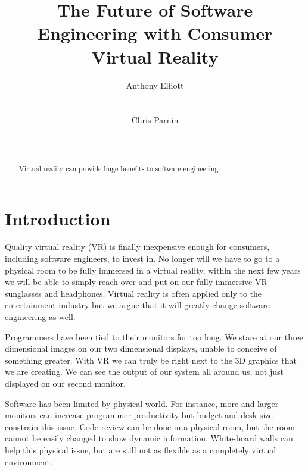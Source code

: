 \documentclass{acm_proc_article-sp}
\begin{document}
\title{The Future of Software Engineering with Consumer Virtual Reality}

\author{
\alignauthor
Anthony Elliott\\
       \\
       \\
\alignauthor
Chris Parnin\\
       \\
       \\
}

\maketitle
\begin{abstract}
Virtual reality can provide huge benefits to software engineering.
\end{abstract}

\section{Introduction}
Quality virtual reality (VR) is finally inexpensive enough for consumers, including software engineers, to invest in. No longer will we have to go to a physical room to be fully immersed in a virtual reality, within the next few years we will be able to simply reach over and put on our fully immersive VR sunglasses and headphones. Virtual reality is often applied only to the entertainment industry but we argue that it will greatly change software engineering as well. 

Programmers have been tied to their monitors for too long. We stare at our three dimensional images on our two dimensional displays, unable to conceive of something greater. With VR we can truly be right next to the 3D graphics that we are creating. We can see the output of our system all around us, not just displayed on our second monitor.

Software has been limited by physical world. For instance, more and larger monitors can increase programmer productivity but budget and desk size constrain this issue.
Code review can be done in a physical room, but the room cannot be easily changed to show dynamic information. White-board walls can help this physical issue, but are still not as flexible as a completely virtual environment.
\end{document}

